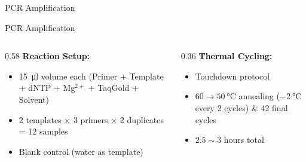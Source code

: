 \documentclass[10pt,hyperref={colorlinks,citecolor=blue,urlcolor=peking_blue,linkcolor=}]{beamer}
\theoremstyle{plain}
\begin{document}
\begin{frame}{PCR Amplification}
    \begin{block}{PCR Amplification}
        \vspace{0.3em}
        \begin{columns}
            \hspace{0.5em}
            \begin{column}{0.58\textwidth}
                \textbf{Reaction Setup:}
                \begin{itemize}
                    \item \qty{15}{\ul} volume each (Primer + Template + dNTP + Mg$^{2+}$ + TaqGold + Solvent)
                    \item 2 templates $\times$ 3 primers $\times$ 2 duplicates = 12 samples 
                    \item Blank control (water as template)
                \end{itemize}
            \end{column}
            \hspace{-2.5em}
            \begin{column}{0.36\textwidth}
                \textbf{Thermal Cycling:}
                \begin{itemize}
                    \item Touchdown protocol
                    \item $60\to\qty{50}{\celsius}$ annealing ($-\qty{2}{\celsius}$ every 2 cycles) \& 42 final cycles
                    \item $2.5\sim3$ hours total
                \end{itemize}
            \end{column}
        \end{columns}
    \end{block}
\end{frame}
\end{document}
